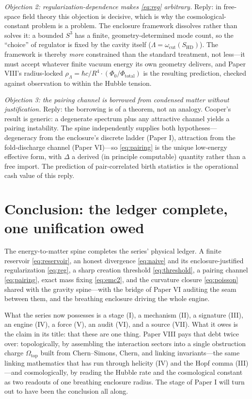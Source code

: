 \documentclass[11pt]{article}
\theoremstyle{remark}
\begin{document}
\emph{Objection 2: regularization-dependence makes \eqref{eq:reg} arbitrary.} Reply: in free-space field theory this objection is decisive, which is why the cosmological-constant problem is a problem. The enclosure framework dissolves rather than solves it: a bounded $S^3$ has a finite, geometry-determined mode count, so the ``choice'' of regulator is fixed by the cavity itself ($\Lambda = \omega_{\mathrm{cut}}(S_{\mathrm{HD}})$). The framework is thereby \emph{more} constrained than the standard treatment, not less---it must accept whatever finite vacuum energy its own geometry delivers, and Paper VIII's radius-locked $\rho_\Lambda = \hbar c/R^4 \cdot (\Phi_0/\Phi_{\mathrm{total}})$ is the resulting prediction, checked against observation to within the Hubble tension.

\emph{Objection 3: the pairing channel is borrowed from condensed matter without justification.} Reply: the borrowing is of a theorem, not an analogy. Cooper's result is generic: a degenerate spectrum plus any attractive channel yields a pairing instability. The spine independently supplies both hypotheses---degeneracy from the enclosure's discrete ladder (Paper I), attraction from the fold-discharge channel (Paper VI)---so \eqref{eq:pairing} is the unique low-energy effective form, with $\Delta$ a derived (in principle computable) quantity rather than a free import. The prediction of pair-correlated birth statistics is the operational cash value of this reply.

\section{Conclusion: the ledger complete, one unification owed}
\label{sec:conclusion}

The energy-to-matter spine completes the series' physical ledger. A finite reservoir \eqref{eq:reservoir}, an honest divergence \eqref{eq:naive} and its enclosure-justified regularization \eqref{eq:reg}, a sharp creation threshold \eqref{eq:threshold}, a pairing channel \eqref{eq:pairing}, exact mass fixing \eqref{eq:emc2}, and the curvature closure \eqref{eq:poisson} shared with the gravity spine---with the bridge of Paper VI auditing the seam between them, and the breathing enclosure driving the whole engine.

What the series now possesses is a stage (I), a mechanism (II), a signature (III), an engine (IV), a force (V), an audit (VI), and a source (VII). What it owes is the claim in its title: that these are one thing. Paper VIII pays that debt twice over: topologically, by assembling the interaction sectors into a single obstruction charge $\Omega_{\mathrm{top}}$ built from Chern--Simons, Chern, and linking invariants---the same linking mathematics that has run through helicity (IV) and the Hopf comma (III)---and cosmologically, by reading the Hubble rate and the cosmological constant as two readouts of one breathing enclosure radius. The stage of Paper I will turn out to have been the conclusion all along.
\end{document}
